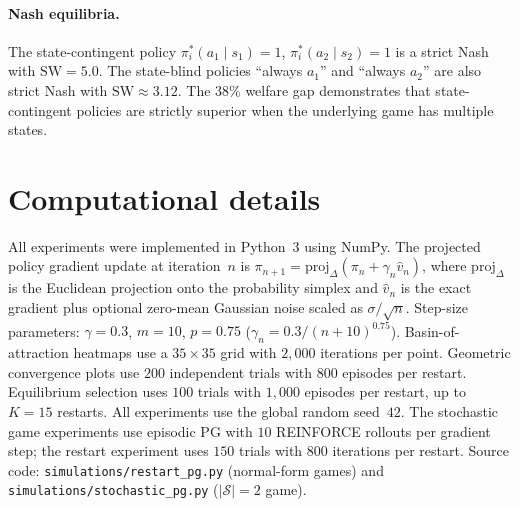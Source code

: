 \documentclass[a4paper,oneside,11pt]{report}
\newcommand{\calS}{\mathcal{S}}
\numberwithin{theorem}{chapter}
\numberwithin{equation}{chapter}
\begin{document}
\paragraph{Nash equilibria.}
The state-contingent policy $\pi^*_i(a_1 \mid s_1) = 1$,
$\pi^*_i(a_2 \mid s_2) = 1$ is a strict Nash with
$\mathrm{SW} = 5.0$. The state-blind policies ``always $a_1$'' and
``always $a_2$'' are also strict Nash with
$\mathrm{SW} \approx 3.12$. The $38\%$ welfare gap demonstrates
that state-contingent policies are strictly superior when the
underlying game has multiple states.

\section*{Computational details}

All experiments were implemented in Python~3 using NumPy. The
projected policy gradient update at iteration~$n$ is
$\pi_{n+1} = \mathrm{proj}_\Delta(\pi_n + \gamma_n \hat v_n)$,
where $\mathrm{proj}_\Delta$ is the Euclidean projection onto the
probability simplex and $\hat v_n$ is the exact gradient plus
optional zero-mean Gaussian noise scaled as $\sigma / \sqrt{n}$.
Step-size parameters: $\gamma = 0.3$, $m = 10$, $p = 0.75$
($\gamma_n = 0.3/(n+10)^{0.75}$). Basin-of-attraction heatmaps
use a $35 \times 35$ grid with $2{,}000$ iterations per point.
Geometric convergence plots use $200$ independent trials with
$800$ episodes per restart. Equilibrium selection uses $100$ trials
with $1{,}000$ episodes per restart, up to $K = 15$ restarts. All
experiments use the global random seed~$42$. The stochastic game
experiments use episodic PG with $10$ REINFORCE rollouts per gradient
step; the restart experiment uses $150$ trials with $800$ iterations
per restart. Source code: \texttt{simulations/restart\_pg.py}
(normal-form games) and \texttt{simulations/stochastic\_pg.py}
($|\calS| = 2$ game).



\end{document}
